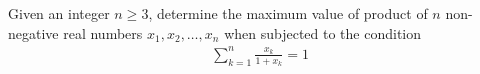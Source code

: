 Given an integer $n \geq 3$, determine the maximum value of product of $n$ non-negative real numbers $x_1,x_2, \ldots , x_n$ when subjected to the condition
\begin{align*} \sum_{k=1}^n \frac{x_k}{1+x_k}  =1 \end{align*}